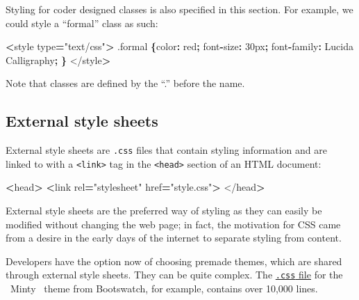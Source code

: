 \documentclass[openany]{book}
\newenvironment{Shaded}{\begin{snugshade}}{\end{snugshade}}
\newcommand{\AttributeTok}[1]{\textcolor[rgb]{0.77,0.63,0.00}{#1}}
\newcommand{\DataTypeTok}[1]{\textcolor[rgb]{0.13,0.29,0.53}{#1}}
\newcommand{\NormalTok}[1]{#1}
\newcommand{\OperatorTok}[1]{\textcolor[rgb]{0.81,0.36,0.00}{\textbf{#1}}}
\newcommand{\StringTok}[1]{\textcolor[rgb]{0.31,0.60,0.02}{#1}}
\begin{document}
Styling for coder designed classes is also specified in this section. For example, we could style a ``formal'' class as such:

\begin{Shaded}
\begin{Highlighting}[]
\OperatorTok{<}\NormalTok{style type}\OperatorTok{=}\StringTok{"text/css"}\OperatorTok{>}
\NormalTok{    .}\AttributeTok{formal} \OperatorTok{\{}\DataTypeTok{color}\OperatorTok{:}\NormalTok{ red}\OperatorTok{;}        
\NormalTok{        font}\OperatorTok{-}\DataTypeTok{size}\OperatorTok{:}\NormalTok{ 30px}\OperatorTok{;}
\NormalTok{        font}\OperatorTok{-}\DataTypeTok{family}\OperatorTok{:}\NormalTok{ Lucida Calligraphy}\OperatorTok{;}
        \OperatorTok{\}}   
\NormalTok{</style}\OperatorTok{>}
\end{Highlighting}
\end{Shaded}

Note that classes are defined by the ``.'' before the name.

\hypertarget{external-style-sheets}{%
\subsection{External style sheets}\label{external-style-sheets}}

External style sheets are \texttt{.css} files that contain styling information and are linked to with a \texttt{\textless{}link\textgreater{}} tag in the \texttt{\textless{}head\textgreater{}} section of an HTML document:

\begin{Shaded}
\begin{Highlighting}[]
\OperatorTok{<}\NormalTok{head}\OperatorTok{>}
    \OperatorTok{<}\NormalTok{link rel}\OperatorTok{=}\StringTok{"stylesheet"}\NormalTok{ href}\OperatorTok{=}\StringTok{"style.css"}\OperatorTok{>}
\NormalTok{</head}\OperatorTok{>}
\end{Highlighting}
\end{Shaded}

External style sheets are the preferred way of styling as they can easily be modified without changing the web page; in fact, the motivation for CSS came from a desire in the early days of the internet to separate styling from content.

Developers have the option now of choosing premade themes, which are shared through external style sheets. They can be quite complex. The \href{https://github.com/thomaspark/bootswatch/blob/master/docs/4/minty/bootstrap.css}{\texttt{.css} file} for the ~Minty~ theme from Bootswatch, for example, contains over 10,000 lines.
\end{document}
